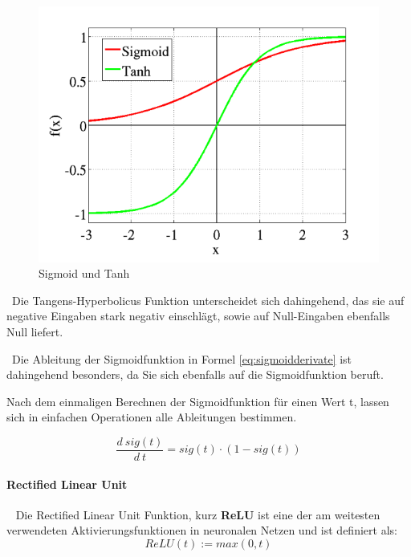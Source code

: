 \begin{figure}[h]
	\begin{center}
		\includegraphics[width=0.65\linewidth]{Bilder/sigmoidtanhplot}
		\caption[Sigmoid und Tanh: \url{
			https://towardsdatascience.com/activation-functions-neural-networks-1cbd9f8d91d6}]{Sigmoid und Tanh}
		\label{fig:SigTanh}
	\end{center}
\end{figure}  

~\newline Die Tangens-Hyperbolicus Funktion unterscheidet sich dahingehend, das sie auf negative Eingaben stark negativ einschlägt, sowie auf Null-Eingaben ebenfalls Null liefert. 

~\newline Die Ableitung der Sigmoidfunktion in Formel \ref{eq:sigmoidderivate} ist dahingehend besonders, da Sie sich ebenfalls auf die Sigmoidfunktion beruft. 

Nach dem einmaligen Berechnen der Sigmoidfunktion für einen Wert t, lassen sich in einfachen Operationen alle Ableitungen bestimmen. 

\begin{equation}
	\label{eq:sigmoidderivate}
	\dfrac{d \ sig(t)}{d \ t} = sig(t) \cdot (1 - sig(t))
\end{equation}  
\paragraph{Rectified Linear Unit}~\newline
Die Rectified Linear Unit Funktion, kurz \textbf{ReLU} ist eine der am weitesten verwendeten Aktivierungsfunktionen in neuronalen Netzen und ist definiert als: 
\begin{equation}
\label{eq:ReLU}
ReLU(t) := max(0,t)
\end{equation}

